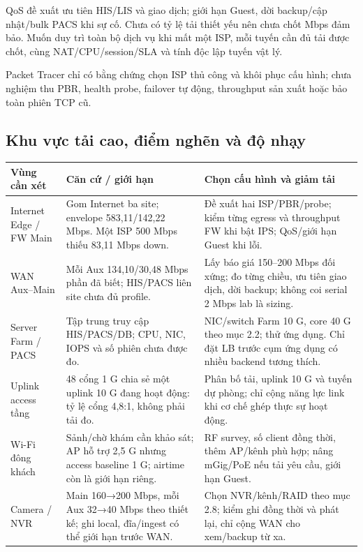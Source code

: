 \documentclass[
  11pt,
]{article}
\begin{document}
QoS đề xuất ưu tiên HIS/LIS và giao dịch; giới hạn Guest, dời backup/cập nhật/bulk PACS khi sự cố. Chưa có tỷ lệ tải thiết yếu nên chưa chốt Mbps đảm bảo. Muốn duy trì toàn bộ dịch vụ khi mất một ISP, mỗi tuyến cần đủ tải được chốt, cùng NAT/CPU/session/SLA và tính độc lập tuyến vật lý.

Packet Tracer chỉ có bằng chứng chọn ISP thủ công và khôi phục cấu hình; chưa nghiệm thu PBR, health probe, failover tự động, throughput sản xuất hoặc bảo toàn phiên TCP cũ.

\clearpage
\subsection{Khu vực tải cao, điểm nghẽn và độ nhạy}
\label{sec:highload}
\par\noindent
{}
\begin{tabularx}{\linewidth}{@{}>{\raggedright\arraybackslash}p{.16\linewidth}XX@{}}\toprule
Vùng cần xét & Căn cứ / giới hạn & Chọn cấu hình và giảm tải\\\midrule
Internet Edge / FW Main & Gom Internet ba site; envelope 583,11/142,22 Mbps. Một ISP 500 Mbps thiếu 83,11 Mbps down. & Đề xuất hai ISP/PBR/probe; kiểm từng egress và throughput FW khi bật IPS; QoS/giới hạn Guest khi lỗi.\\
WAN Aux--Main & Mỗi Aux 134,10/30,48 Mbps phần đã biết; HIS/PACS liên site chưa đủ profile. & Lấy báo giá 150--200 Mbps đối xứng; đo từng chiều, ưu tiên giao dịch, dời backup; không coi serial 2 Mbps lab là sizing.\\
Server Farm / PACS & Tập trung truy cập HIS/PACS/DB; CPU, NIC, IOPS và số phiên chưa được đo. & NIC/switch Farm 10 G, core 40 G theo mục 2.2; thử ứng dụng. Chỉ đặt LB trước cụm ứng dụng có nhiều backend tương thích.\\
Uplink access tầng & 48 cổng 1 G chia sẻ một uplink 10 G đang hoạt động: tỷ lệ cổng 4,8:1, không phải tải đo. & Phân bố tải, uplink 10 G và tuyến dự phòng; chỉ cộng năng lực link khi cơ chế ghép thực sự hoạt động.\\
Wi-Fi đông khách & Sảnh/chờ khám cần khảo sát; AP hỗ trợ 2,5 G nhưng access baseline 1 G; airtime còn là giới hạn riêng. & RF survey, số client đồng thời, thêm AP/kênh phù hợp; nâng mGig/PoE nếu tải yêu cầu, giới hạn Guest.\\
Camera / NVR & Main 160→200 Mbps, mỗi Aux 32→40 Mbps theo thiết kế; ghi local, đĩa/ingest có thể giới hạn trước WAN. & Chọn NVR/kênh/RAID theo mục 2.8; kiểm ghi đồng thời và phát lại, chỉ cộng WAN cho xem/backup từ xa.\\\bottomrule\end{tabularx}\par
\end{document}
